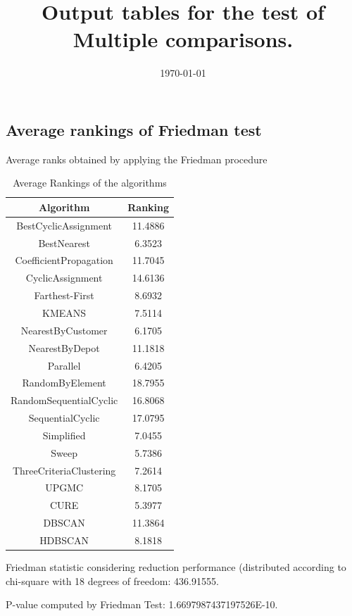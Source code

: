 \documentclass[a4paper,10pt]{article}
\title{Output tables for the test of Multiple comparisons.}
\author{}
\date{\today}
\begin{document}
\begin{landscape}
\pagestyle{empty}
\maketitle
\thispagestyle{empty}
\section{Average rankings of Friedman test}



Average ranks obtained by applying the Friedman procedure

\begin{table}[!htp]
\centering
\begin{tabular}{|c|c|}\hline
Algorithm&Ranking\\\hline
BestCyclicAssignment & 11.4886\\
BestNearest & 6.3523\\
CoefficientPropagation & 11.7045\\
CyclicAssignment & 14.6136\\
Farthest-First & 8.6932\\
KMEANS & 7.5114\\
NearestByCustomer & 6.1705\\
NearestByDepot & 11.1818\\
Parallel & 6.4205\\
RandomByElement & 18.7955\\
RandomSequentialCyclic & 16.8068\\
SequentialCyclic & 17.0795\\
Simplified & 7.0455\\
Sweep & 5.7386\\
ThreeCriteriaClustering & 7.2614\\
UPGMC & 8.1705\\
CURE & 5.3977\\
DBSCAN & 11.3864\\
HDBSCAN & 8.1818\\
\hline
\end{tabular}
\caption{Average Rankings of the algorithms}
\end{table}

Friedman statistic considering reduction performance (distributed according to chi-square with 18 degrees of freedom: 436.91555.

P-value computed by Friedman Test: 1.6697987437197526E-10.\newline


\end{landscape}
\end{document}
